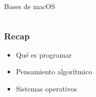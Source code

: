 \documentclass[14pt,aspectratio=169,xcolor=dvipsnames]{beamer}
\begin{document}
\begin{frame}
\begin{columns}
\begin{column}{0.5\textwidth}
{                Bases de macOS}
        \end{column}
    \end{columns}
\end{frame}
\begin{frame}\frametitle{Recap}
    \begin{itemize}
        \item Qué es programar
        \item Pensamiento algorítmico
        \item Sistemas operativos
    \end{itemize}
\end{frame}
\begin{frame}
    \maketitle
\end{frame}
\end{document}
